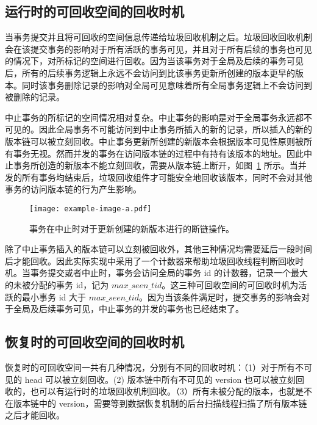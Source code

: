 \subsection{运行时的可回收空间的回收时机}

当事务提交并且将可回收的空间信息传递给垃圾回收机制之后。垃圾回收回收机制会在该提交事务的影响对于所有活跃的事务可见，并且对于所有后续的事务也可见的情况下，对所标记的空间进行回收。因为当该事务对于全局及后续的事务可见后，所有的后续事务逻辑上永远不会访问到比该事务更新所创建的版本更早的版本。同时该事务删除记录的影响对全局可见意味着所有全局事务逻辑上不会访问到被删除的记录。

中止事务的所标记的空间情况相对复杂。中止事务的影响是对于全局事务永远都不可见的。因此全局事务不可能访问到中止事务所插入的新的记录，所以插入的新的版本链可以被立刻回收。中止事务更新所创建的新版本会根据版本可见性原则被所有事务无视。然而并发的事务在访问版本链的过程中有持有该版本的地址。因此中止事务所创造的新版本不能立刻回收，需要从版本链上断开，如图~\ref{fig:insert-abort} 所示。当并发的所有事务均结束后，垃圾回收组件才可能安全地回收该版本，同时不会对其他事务的访问版本链的行为产生影响。


\begin{figure}
    \centering
    \texttt{[image: example-image-a.pdf]}
    \caption{事务在中止时对于更新创建的新版本进行的断链操作。}
    \label{fig:insert-abort}
\end{figure}

除了中止事务插入的版本链可以立刻被回收外，其他三种情况均需要延后一段时间后才能回收。因此实际实现中采用了一个计数器来帮助垃圾回收线程判断回收时机。当事务提交或者中止时，事务会访问全局的事务 id 的计数器，记录一个最大的未被分配的事务 id，记为 $max\_seen\_tid$。这三种可回收空间的可回收时机为活跃的最小事务 id 大于 $max\_seen\_tid$。因为当该条件满足时，提交事务的影响会对于全局及后续事务可见，中止事务的并发的事务也已经结束了。

\subsection{恢复时的可回收空间的回收时机}

恢复时的可回收空间一共有几种情况，分别有不同的回收时机：（1）对于所有不可见的 head 可以被立刻回收。(2) 版本链中所有不可见的 version 也可以被立刻回收的，也可以有运行时的垃圾回收机制回收。（3）所有未被分配的版本，也就是不在版本链中的 version，需要等到数据恢复机制的后台扫描线程扫描了所有版本链之后才能回收。


